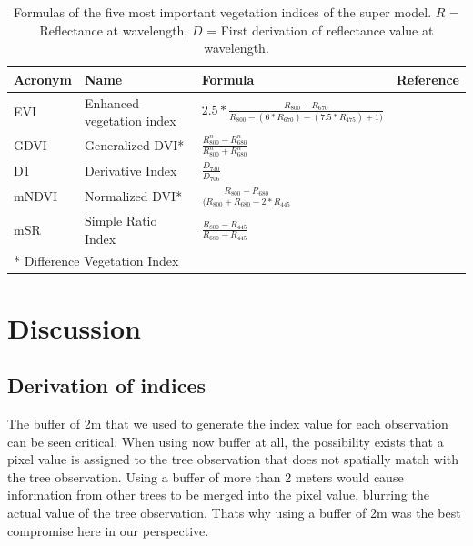 \documentclass[review]{elsarticle}
\begin{document}
\begin{table}[t!]
\centering
\caption[t]{Formulas of the five most important vegetation indices of the super model. $R$ = Reflectance at wavelength, $D$ = First derivation of reflectance value at wavelength.}
\begingroup\footnotesize
\begin{tabular}{llll}
	\\
	Acronym & Name                      & Formula                                                            & Reference                                                 \\
	\hline
	EVI     & Enhanced vegetation index & $2.5*\frac{R_{800}-R_{670}}{R_{800}-(6*R_{670})-(7.5*R_{475})+1)}$ & \cite{hueteComparisonVegetationIndices1997}               \\
	GDVI    & Generalized DVI*          & $\frac{R_{800}^n-R_{680}^n}{R_{800}^n+R_{680}^n}$                  & \cite{wuEstimatingChlorophyllContent2008}                 \\
	D1      & Derivative Index          & $\frac{D_{730}}{D_{706}}$                                          & \cite{zarco-tejadaSteadystateChlorophyllFluorescence2003} \\
	mNDVI   & Normalized DVI*           & $  \frac{R_{800}-R_{680}}{(R_{800}+R_{680}-2*R_{445}}$             & \cite{simsRelationshipsLeafPigment2002}                   \\
	mSR     & Simple Ratio Index        & $\frac{R_{800}-R_{445}}{R_{680}-R_{445}}$                          & \cite{simsRelationshipsLeafPigment2002}                   \\
	\bottomrule
	\multicolumn{2}{l}{\small{* Difference Vegetation Index}}
\end{tabular}
\endgroup
\label{tab:most_imp_vars}
\end{table}


\section{Discussion}

\subsection{Derivation of indices}

The buffer of 2m that we used to generate the index value for each observation can be seen critical.
When using now buffer at all, the possibility exists that a pixel value is assigned to the tree observation that does not spatially match with the tree observation.
Using a buffer of more than 2 meters would cause information from other trees to be merged into the pixel value, blurring the actual value of the tree observation.
Thats why using a buffer of 2m was the best compromise here in our perspective.
\end{document}
